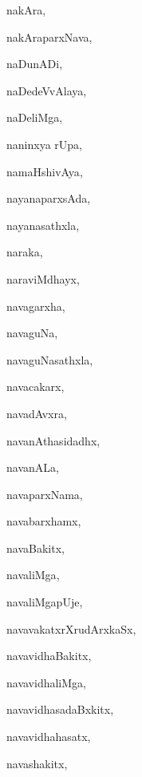 \begin{multicols}{3}
{\noindent
{nakAra}, \pageref{nakAra}

\noindent
{nakAraparxNava}, \pageref{nakAraparxNava}

\noindent
{naDunADi}, \pageref{naDunADi}

\noindent
{naDedeVvAlaya}, \pageref{naDedeVvAlaya}

\noindent
{naDeliMga}, \pageref{naDeliMga}

\noindent
{naninxya rUpa}, \pageref{naninxya rUpa}

\noindent
{namaHshivAya}, \pageref{namaHshivAya}

\noindent
{nayanaparxsAda}, \pageref{nayanaparxsAda}

\noindent
{nayanasathxla}, \pageref{nayanasathxla}

\noindent
{naraka}, \pageref{naraka}

\noindent
{naraviMdhayx}, \pageref{naraviMdhayx}

\noindent
{navagarxha}, \pageref{navagarxha}

\noindent
{navaguNa}, \pageref{navaguNa}

\noindent
{navaguNasathxla}, \pageref{navaguNasathxla}

\noindent
{navacakarx}, \pageref{navacakarx}

\noindent
{navadAvxra}, \pageref{navadAvxra}

\noindent
{navanAthasidadhx}, \pageref{navanAthasidadhx}

\noindent
{navanALa}, \pageref{navanALa}

\noindent
{navaparxNama}, \pageref{navaparxNama}

\noindent
{navabarxhamx}, \pageref{navabarxhamx}

\noindent
{navaBakitx}, \pageref{navaBakitx}

\noindent
{navaliMga}, \pageref{navaliMga}

\noindent
{navaliMgapUje}, \pageref{navaliMgapUje}

\noindent
{navavakatxrXrudArxkaSx}, \pageref{navavakatxrXrudArxkaSx}

\noindent
{navavidhaBakitx}, \pageref{navavidhaBakitx}

\noindent
{navavidhaliMga}, \pageref{navavidhaliMga}

\noindent
{navavidhasadaBxkitx}, \pageref{navavidhasadaBxkitx}

\noindent
{navavidhahasatx}, \pageref{navavidhahasatx}

\noindent
{navashakitx}, \pageref{navashakitx}

}
\end{multicols}

